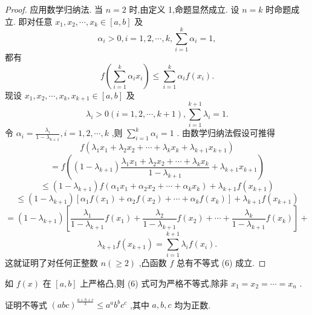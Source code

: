 \begin{proof}
应用数学归纳法. 当 \(n = 2\) 时,由定义 1,命题显然成立. 设 \(n = k\) 时命题成立. 即对任意 \({x}_{1},{x}_{2},\cdots ,{x}_{k} \in  \left\lbrack  {a,b}\right\rbrack\) 及
\[
{\alpha }_{i} > 0,i = 1,2,\cdots ,k,\mathop{\sum }\limits_{{i = 1}}^{k}{\alpha }_{i} = 1,
\]
都有
\[
f\left( {\mathop{\sum }\limits_{{i = 1}}^{k}{\alpha }_{i}{x}_{i}}\right)  \leq  \mathop{\sum }\limits_{{i = 1}}^{k}{\alpha }_{i}f\left( {x}_{i}\right) .
\]
现设 \({x}_{1},{x}_{2},\cdots ,{x}_{k},{x}_{k + 1} \in  \left\lbrack  {a,b}\right\rbrack\) 及
\[
{\lambda }_{i} > 0\left( {i = 1,2,\cdots ,k + 1}\right) ,\mathop{\sum }\limits_{{i = 1}}^{{k + 1}}{\lambda }_{i} = 1.
\]
令 \({\alpha }_{i} = \frac{{\lambda }_{i}}{1 - {\lambda }_{k + 1}},i = 1,2,\cdots ,k\) ,则 \(\mathop{\sum }\limits_{{i = 1}}^{k}{\alpha }_{i} = 1\) . 由数学归纳法假设可推得
\[
f\left( {{\lambda }_{1}{x}_{1} + {\lambda }_{2}{x}_{2} + \cdots  + {\lambda }_{k}{x}_{k} + {\lambda }_{k + 1}{x}_{k + 1}}\right)
\]
\[
= f\left( {\left( {1 - {\lambda }_{k + 1}}\right) \frac{{\lambda }_{1}{x}_{1} + {\lambda }_{2}{x}_{2} + \cdots  + {\lambda }_{k}{x}_{k}}{1 - {\lambda }_{k + 1}} + {\lambda }_{k + 1}{x}_{k + 1}}\right)
\]
\[
\leq  \left( {1 - {\lambda }_{k + 1}}\right) f\left( {{\alpha }_{1}{x}_{1} + {\alpha }_{2}{x}_{2} + \cdots  + {\alpha }_{k}{x}_{k}}\right)  + {\lambda }_{k + 1}f\left( {x}_{k + 1}\right)
\]
\[
\leq  \left( {1 - {\lambda }_{k + 1}}\right) \left\lbrack  {{\alpha }_{1}f\left( {x}_{1}\right)  + {\alpha }_{2}f\left( {x}_{2}\right)  + \cdots  + {\alpha }_{k}f\left( {x}_{k}\right) }\right\rbrack   + {\lambda }_{k + 1}f\left( {x}_{k + 1}\right)
\]
\[
= \left( {1 - {\lambda }_{k + 1}}\right) \left\lbrack  {\frac{{\lambda }_{1}}{1 - {\lambda }_{k + 1}}f\left( {x}_{1}\right)  + \frac{{\lambda }_{2}}{1 - {\lambda }_{k + 1}}f\left( {x}_{2}\right)  + \cdots  + \frac{{\lambda }_{k}}{1 - {\lambda }_{k + 1}}f\left( {x}_{k}\right) }\right\rbrack   +
\]
\[
{\lambda }_{k + 1}f\left( {x}_{k + 1}\right)  = \mathop{\sum }\limits_{{i = 1}}^{{k + 1}}{\lambda }_{i}f\left( {x}_{i}\right) .
\]
这就证明了对任何正整数 \(n\left( { \geq  2}\right)\) ,凸函数 \(f\) 总有不等式 (6) 成立.
\end{proof}


\begin{remark}
如 \(f\left( x\right)\) 在 \(\left\lbrack  {a,b}\right\rbrack\) 上严格凸,则 (6) 式可为严格不等式,除非 \({x}_{1} = {x}_{2} = \cdots  = {x}_{n}\) .
\end{remark}


\begin{example}
证明不等式 \({\left( abc\right) }^{\frac{a + b + c}{3}} \leq  {a}^{a}{b}^{b}{c}^{c}\) ,其中 \(a,b,c\) 均为正数.
\end{example}

